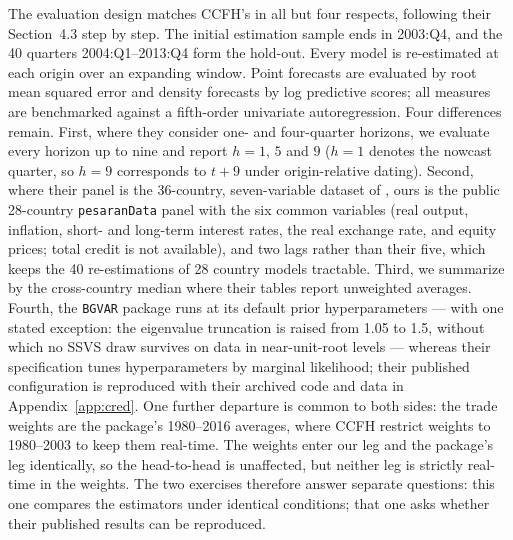 The evaluation design matches CCFH's in all but four respects, following their
Section~4.3 step by step. The initial estimation sample ends in 2003:Q4, and the 40 quarters
2004:Q1--2013:Q4 form the hold-out. Every model is re-estimated at each origin over an
expanding window. Point forecasts are evaluated by root mean squared error and density
forecasts by log predictive scores; all measures are benchmarked against a fifth-order
univariate autoregression. Four differences remain. First, where they consider one- and
four-quarter horizons, we evaluate every horizon up to nine and report $h=1$, $5$ and $9$
($h=1$ denotes the nowcast quarter, so $h=9$ corresponds to $t+9$ under origin-relative
dating). Second, where their panel is the 36-country, seven-variable dataset of
\citet{DovernFeldkircherHuber2015}, ours is the public 28-country \texttt{pesaranData}
panel with the six common variables (real output, inflation, short- and long-term
interest rates, the real exchange rate, and equity prices; total credit is not
available), and two lags rather than their five, which keeps the 40 re-estimations of 28
country models tractable. Third, we summarize by the cross-country median where their
tables report unweighted averages. Fourth, the \texttt{BGVAR} package runs at its default
prior hyperparameters --- with one stated exception: the eigenvalue truncation is raised
from 1.05 to 1.5, without which no SSVS draw survives on data in near-unit-root levels
--- whereas their specification tunes hyperparameters by marginal likelihood; their
published configuration is reproduced with their archived code and data in
Appendix~\ref{app:cred}. One further departure is common to both sides: the trade
weights are the package's 1980--2016 averages, where CCFH restrict weights to
1980--2003 to keep them real-time. The weights enter our leg and the package's leg
identically, so the head-to-head is unaffected, but neither leg is strictly real-time in
the weights. The two exercises therefore answer separate questions: this
one compares the estimators under identical conditions; that one asks whether their
published results can be reproduced.

\begin{table}[t]
\centering
\caption{Point-forecast accuracy on the CCFH design: relative RMSE against the AR(5)
benchmark, median across the 28 \texttt{pesaranData} countries (40 origins, 2004--2013,
re-estimated at every origin). A dagger marks cells whose summed log predictive score
exceeds that of the AR(5). ``+anch.''\ applies the long-run targets of
Section~\ref{sec:anchors}: drift targets for trending log-levels, the recursive
as-of-origin mean for inflation, and, for the interest rates, the forward-rate path
implied by each origin's own yield curve under the expectations hypothesis (see text). No
future information enters any target. The SSVS and MN columns run the \texttt{BGVAR}
package at default hyperparameters; RW is the last-observation random walk, point-scored
only.}
\label{tab:ccfhmatrix}
\footnotesize\setlength{\tabcolsep}{3pt}
\begin{center}

\end{center}
\end{table}

